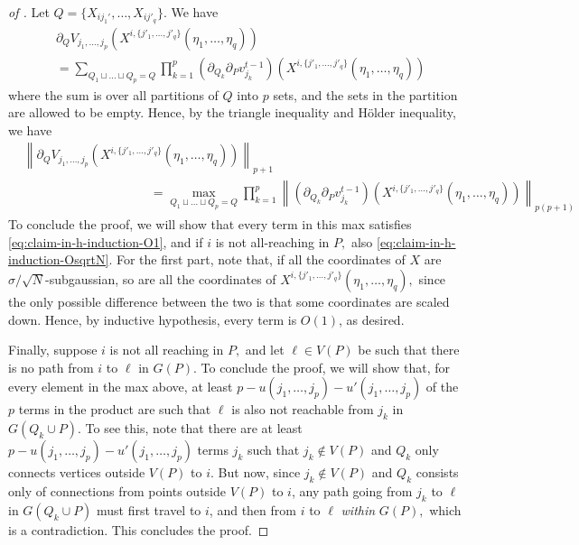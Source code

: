 \documentclass{article}
\newcommand{\1}{\mathbbm{1}}
\newcommand{\norm}[1]{\left\lVert#1\right\rVert}
\theoremstyle{plain}
\theoremstyle{definition}
\theoremstyle{remark}
\begin{document}
\begin{proof}[of ]
Let $Q = \{X_{ij_1'},\dots,X_{ij'_q}\}.$ We have
\begin{align*}
    &\partial_Q V_{j_1,\dots,j_p}(X^{i,\{j'_1,\dots,j'_q\}}(\eta_1,\dots,\eta_q)) \\
    &=  \sum_{Q_1\sqcup\dots\sqcup Q_p = Q} \prod_{k=1}^p (\partial_{Q_k}\partial_P v^{t-1}_{j_k})(X^{i,\{j'_1,\dots,j'_q\}}(\eta_1,\dots,\eta_q))
\end{align*}
where the sum is over all partitions of $Q$ into $p$ sets, and the sets in the partition are allowed to be empty. Hence, by the triangle inequality and Hölder inequality, we have
\begin{align*}
    &\norm{\partial_Q V_{j_1,\dots,j_p}(X^{i,\{j'_1,\dots,j'_q\}}(\eta_1,\dots,\eta_q))}_{p+1} \\
    &\qquad\qquad \qquad\qquad\qquad=  \max_{Q_1\sqcup\dots\sqcup Q_p = Q} \prod_{k=1}^p\norm{(\partial_{Q_k}\partial_P v^{t-1}_{j_k})(X^{i,\{j'_1,\dots,j'_q\}}(\eta_1,\dots,\eta_q))}_{p(p+1)}
\end{align*}
To conclude the proof, we will show that every term in this max satisfies \eqref{eq:claim-in-h-induction-O1}, and if $i$ is not all-reaching in $P,$ also \eqref{eq:claim-in-h-induction-OsqrtN}. For the first part, note that, if all the coordinates of $X$ are $\sigma/\sqrt{N}$-subgaussian, so are all the coordinates of $X^{i,\{j'_1,\dots,j'_q\}}(\eta_1,\dots,\eta_q),$ since the only possible difference between the two is that some coordinates are scaled down. Hence, by inductive hypothesis, every term is $O(1)$, as desired.

    Finally, suppose $i$ is not all reaching in $P,$ and let $\ell \in V(P)$ be such that there is no path from $i$ to $\ell$ in $G(P).$ To conclude the proof, we will show that, for every element in the max above, at least $p-u(j_1,\dots,j_p)-u'(j_1,\dots,j_p)$ of the $p$ terms in the product are such that $\ell$ is also not reachable from $j_k$ in $G(Q_k\cup P).$ To see this, note that there are at least $p - u(j_1,\dots,j_p) - u'(j_1,\dots,j_p)$ terms $j_k$ such that $j_k \notin V(P)$ and $Q_k$ only connects vertices outside $V(P)$ to $i$. But now, since $j_k \notin V(P)$ and $Q_k$ consists only of connections from points outside $V(P)$ to $i$, any path going from $j_k$ to $\ell$ in $G(Q_k\cup P)$ must first travel to $i$, and then from $i$ to $\ell$ \emph{within} $G(P),$ which is a contradiction. This concludes the proof.
\end{proof}
\end{document}
